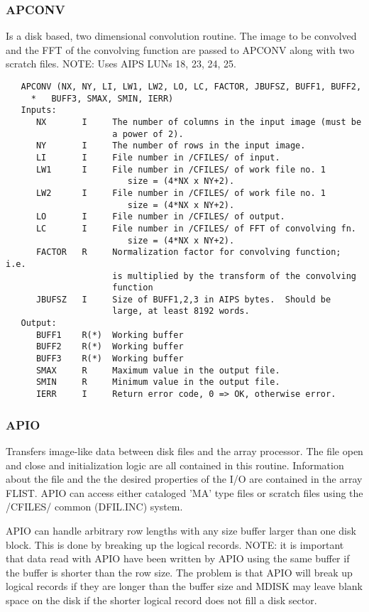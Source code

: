 \subsubsection{APCONV}
Is a disk based, two dimensional convolution routine.
The image to be convolved and the FFT of the convolving function
are passed to APCONV along with two scratch files.
NOTE: Uses AIPS LUNs 18, 23, 24, 25.
\begin{verbatim}
   APCONV (NX, NY, LI, LW1, LW2, LO, LC, FACTOR, JBUFSZ, BUFF1, BUFF2,
     *   BUFF3, SMAX, SMIN, IERR)
   Inputs:
      NX       I     The number of columns in the input image (must be
                     a power of 2).
      NY       I     The number of rows in the input image.
      LI       I     File number in /CFILES/ of input.
      LW1      I     File number in /CFILES/ of work file no. 1
                        size = (4*NX x NY+2).
      LW2      I     File number in /CFILES/ of work file no. 1
                        size = (4*NX x NY+2).
      LO       I     File number in /CFILES/ of output.
      LC       I     File number in /CFILES/ of FFT of convolving fn.
                        size = (4*NX x NY+2).
      FACTOR   R     Normalization factor for convolving function; i.e.
                     is multiplied by the transform of the convolving
                     function
      JBUFSZ   I     Size of BUFF1,2,3 in AIPS bytes.  Should be
                     large, at least 8192 words.
   Output:
      BUFF1    R(*)  Working buffer
      BUFF2    R(*)  Working buffer
      BUFF3    R(*)  Working buffer
      SMAX     R     Maximum value in the output file.
      SMIN     R     Minimum value in the output file.
      IERR     I     Return error code, 0 => OK, otherwise error.
\end{verbatim}

\subsubsection{APIO}
Transfers image-like data between disk files and the array
processor.  The file open and close and initialization logic are
all contained in this routine.  Information about the file and the
the desired properties of the I/O are contained in the array FLIST.
APIO can access either cataloged 'MA' type files or scratch files
using the /CFILES/ common (DFIL.INC) system.

APIO can handle arbitrary row lengths with any size buffer larger
than one disk block.  This is done by breaking up the logical
records.  NOTE: it is important that data read with APIO have been
written by APIO using the same buffer if the buffer is shorter than
the row size.  The problem is that APIO will break up logical
records if they are  longer than the buffer size and MDISK may leave
blank space on the disk if the shorter logical record does not fill
a  disk sector.

